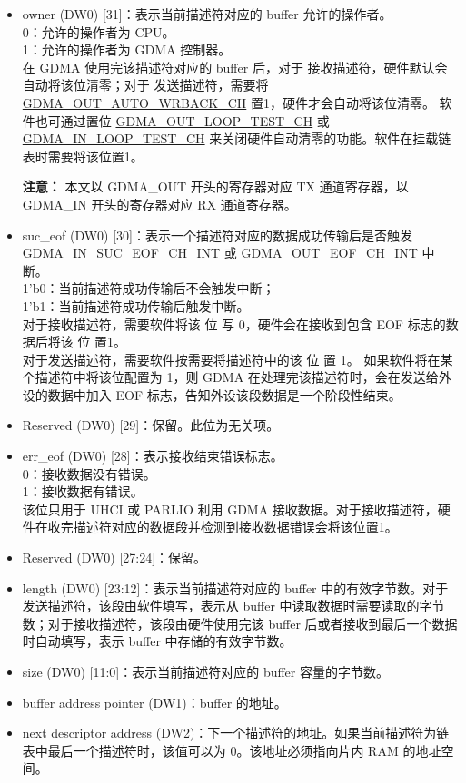 \documentclass[main\_\_CN.tex]{subfiles}
\begin{document}
\begin{itemize}
    \item owner (DW0) [31]：表示当前描述符对应的 buffer 允许的操作者。\\
    0：允许的操作者为 CPU。\\
    1：允许的操作者为 GDMA 控制器。\\
    在 GDMA 使用完该描述符对应的 buffer 后，对于 接收描述符，硬件默认会自动将该位清零；对于 发送描述符，需要将 \hyperref[fielddesc:GDMAOUTAUTOWRBACKCHN]{GDMA\_OUT\_AUTO\_WRBACK\_CH} 置1，硬件才会自动将该位清零。 软件也可通过置位 \hyperref[fielddesc:GDMAOUTLOOPTESTCHN]{GDMA\_OUT\_LOOP\_TEST\_CH} 或 \hyperref[fielddesc:GDMAINLOOPTESTCHN]{GDMA\_IN\_LOOP\_TEST\_CH} 来关闭硬件自动清零的功能。软件在挂载链表时需要将该位置1。

    {\bfseries 注意： }本文以 GDMA\_OUT 开头的寄存器对应 TX 通道寄存器，以 GDMA\_IN 开头的寄存器对应 RX 通道寄存器。
    \item suc\_eof (DW0) [30]：表示一个描述符对应的数据成功传输后是否触发 GDMA\_IN\_SUC\_EOF\_CH\_INT 或 GDMA\_OUT\_EOF\_CH\_INT 中断。\\
    1'b0：当前描述符成功传输后不会触发中断；\\
    1'b1：当前描述符成功传输后触发中断。\\
    对于接收描述符，需要软件将该 位 写 0，硬件会在接收到包含 EOF 标志的数据后将该 位 置1。\\对于发送描述符，需要软件按需要将描述符中的该 位 置 1。
    如果软件将在某个描述符中将该位配置为 1，则 GDMA 在处理完该描述符时，会在发送给外设的数据中加入 EOF 标志，告知外设该段数据是一个阶段性结束。
    \item Reserved (DW0) [29]：保留。此位为无关项。
    \item err\_eof (DW0) [28]：表示接收结束错误标志。\\
    0：接收数据没有错误。\\
    1：接收数据有错误。\\
    该位只用于 UHCI 或 PARLIO 利用 GDMA 接收数据。对于接收描述符，硬件在收完描述符对应的数据段并检测到接收数据错误会将该位置1。
    \item Reserved (DW0) [27:24]：保留。
    \item length (DW0) [23:12]：表示当前描述符对应的 buffer 中的有效字节数。对于发送描述符，该段由软件填写，表示从 buffer 中读取数据时需要读取的字节数；对于接收描述符，该段由硬件使用完该 buffer 后或者接收到最后一个数据时自动填写，表示 buffer 中存储的有效字节数。
    \item size (DW0) [11:0]：表示当前描述符对应的 buffer 容量的字节数。
    \item buffer address pointer (DW1)：buffer 的地址。
    \item next descriptor address (DW2)：下一个描述符的地址。如果当前描述符为链表中最后一个描述符时，该值可以为 0。该地址必须指向片内 RAM 的地址空间。
\end{itemize}
\end{document}
